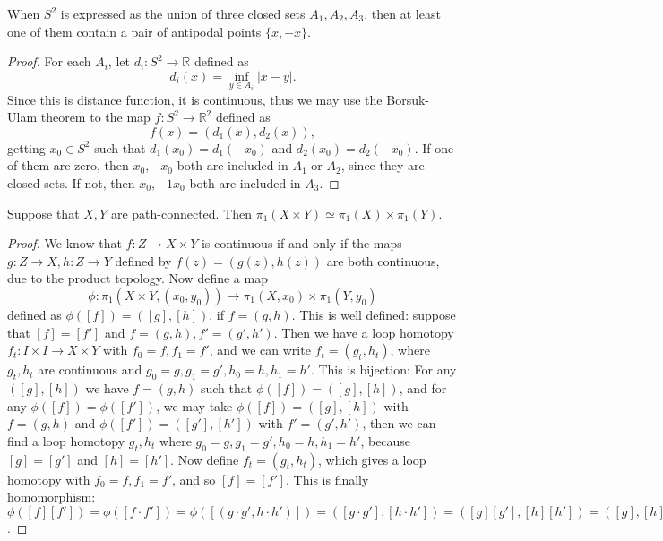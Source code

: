 \begin{cor} When $S^2$ is expressed as the union of three closed sets $A_1, A_2, A_3$, then at least one of them contain a pair of antipodal points $\{x,-x\}$.
\end{cor}
\begin{proof}
For each $A_i$, let $d_i:S^2\rightarrow \mathbb{R}$ defined as
\begin{equation}
d_i(x)=\inf_{y\in A_i}|x-y|.
\end{equation}
Since this is distance function, it is continuous, thus we may use the Borsuk-Ulam theorem to the map $f:S^2\rightarrow \mathbb{R}^2$ defined as
\begin{equation}
f(x)=(d_1(x),d_2(x)),
\end{equation}
getting $x_0\in S^2$ such that $d_1(x_0)=d_1(-x_0)$ and $d_2(x_0)=d_2(-x_0)$. If one of them are zero, then $x_0,-x_0$ both are included in $A_1$ or $A_2$, since they are closed sets. If not, then $x_0,-1x_0$ both are included in $A_3$.
\end{proof}

\begin{prop} Suppose that $X,Y$ are path-connected. Then $\pi_1(X\times Y)\simeq \pi_1(X)\times \pi_1(Y)$.
\end{prop}
\begin{proof}
We know that $f:Z\rightarrow X\times Y$ is continuous if and only if the maps $g:Z\rightarrow X, h:Z\rightarrow Y$ defined by $f(z)=(g(z),h(z))$ are both continuous, due to the product topology. Now define a map
\begin{equation}
\phi:\pi_1(X\times Y,(x_0,y_0))\rightarrow \pi_1(X,x_0)\times \pi_1(Y,y_0)
\end{equation}
defined as $\phi([f])=([g],[h])$, if $f=(g,h)$. This is well defined: suppose that $[f]=[f']$ and $f=(g,h), f'=(g',h')$. Then we have a loop homotopy $f_t:I\times I\rightarrow X\times Y$ with $f_0=f,f_1=f'$, and we can write $f_t=(g_t,h_t)$, where $g_t, h_t$ are continuous and $g_0=g,g_1=g',h_0=h,h_1=h'$. This is bijection: For any $([g],[h])$ we have $f=(g,h)$ such that $\phi([f])=([g],[h])$, and for any $\phi([f])=\phi([f'])$, we may   take $\phi([f])=([g],[h])$ with $f=(g,h)$ and $\phi([f'])=([g'],[h'])$ with $f'=(g',h')$, then we can find a loop homotopy $g_t,h_t$ where $g_0=g,g_1=g',h_0=h,h_1=h'$, because $[g]=[g']$ and $[h]=[h']$. Now define $f_t=(g_t,h_t)$, which gives a loop homotopy with $f_0=f, f_1=f'$, and so $[f]=[f']$. This is finally homomorphism: $\phi([f][f'])=\phi([f\cdot f'])=\phi([(g\cdot g',h\cdot h')])=([g\cdot g'],[h\cdot h'])=([g][g'],[h][h'])=([g],[h])([g'],[h'])$.
\end{proof}

